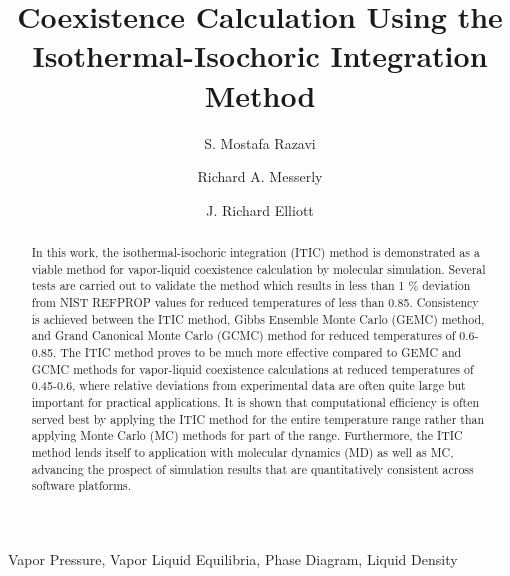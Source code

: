 \documentclass[5p,times]{elsarticle}
\begin{document}
\begin{frontmatter}

\title{Coexistence Calculation Using the Isothermal-Isochoric Integration Method}

\author{S. Mostafa Razavi}
\address{Department of Chemical and Biomolecular Engineering, The University of Akron, Akron, Ohio 44325, USA}

\author{Richard A. Messerly}
\address{Thermodynamics Research Center, National Institute of Standards and Technology, Boulder, Colorado 80305, USA}



\author{J. Richard Elliott }
\address{Department of Chemical and Biomolecular Engineering, The University of Akron, Akron, Ohio 44325, USA}

\begin{abstract}
In this work, the isothermal-isochoric integration (ITIC) method is demonstrated as a viable method for vapor-liquid coexistence calculation by molecular simulation. Several tests are carried out to validate the method which results in less than 1 \% deviation from NIST REFPROP values for reduced temperatures of less than 0.85. Consistency is achieved between the ITIC method, Gibbs Ensemble Monte Carlo (GEMC) method, and Grand Canonical Monte Carlo (GCMC) method for reduced temperatures of 0.6-0.85. The ITIC method proves to be much more effective compared to GEMC and GCMC methods for vapor-liquid coexistence calculations at reduced temperatures of 0.45-0.6, where relative deviations from experimental data are often quite large but important for practical applications. It is shown that computational efficiency is often served best by applying the ITIC method for the entire temperature range rather than applying Monte Carlo (MC) methods for part of the range. Furthermore, the ITIC method lends itself to application with molecular dynamics (MD) as well as MC, advancing the prospect of simulation results that are quantitatively consistent across software platforms.
\end{abstract}

\begin{keyword}
Vapor Pressure, Vapor Liquid Equilibria, Phase Diagram, Liquid Density
\end{keyword}

\end{frontmatter}
\end{document}
